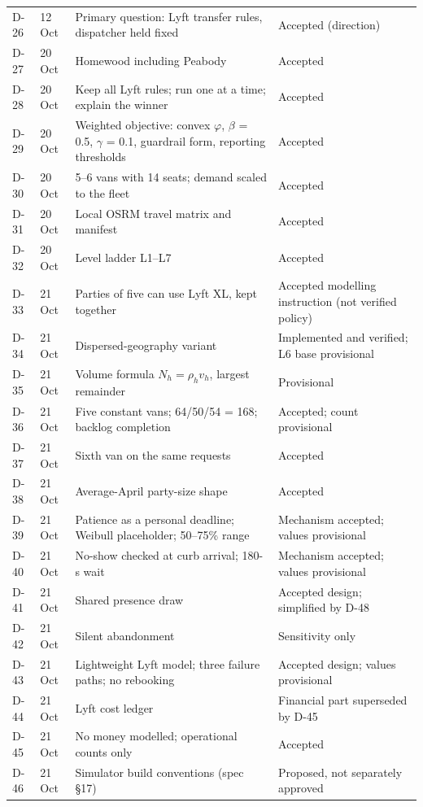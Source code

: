 \documentclass[11pt,letterpaper]{article}
\begin{document}
{\begin{longtable}{@{}P{1.25cm}P{1.45cm}P{8.0cm}P{3.0cm}@{}}
D-26 & 12 Oct & Primary question: Lyft transfer rules, dispatcher held fixed & Accepted (direction)\\
D-27 & 20 Oct & Homewood including Peabody & Accepted\\
D-28 & 20 Oct & Keep all Lyft rules; run one at a time; explain the winner & Accepted\\
D-29 & 20 Oct & Weighted objective: convex $\varphi$, $\beta$ = 0.5, $\gamma$ = 0.1, guardrail form, reporting thresholds & Accepted\\
D-30 & 20 Oct & 5--6 vans with 14 seats; demand scaled to the fleet & Accepted\\
D-31 & 20 Oct & Local OSRM travel matrix and manifest & Accepted\\
D-32 & 20 Oct & Level ladder L1--L7 & Accepted\\
D-33 & 21 Oct & Parties of five can use Lyft XL, kept together & Accepted modelling instruction (not verified policy)\\
D-34 & 21 Oct & Dispersed-geography variant & Implemented and verified; L6 base provisional\\
D-35 & 21 Oct & Volume formula $N_h = \rho_h v_h$, largest remainder & Provisional\\
D-36 & 21 Oct & Five constant vans; 64/50/54 = 168; backlog completion & Accepted; count provisional\\
D-37 & 21 Oct & Sixth van on the same requests & Accepted\\
D-38 & 21 Oct & Average-April party-size shape & Accepted\\
D-39 & 21 Oct & Patience as a personal deadline; Weibull placeholder; 50--75\% range & Mechanism accepted; values provisional\\
D-40 & 21 Oct & No-show checked at curb arrival; 180-s wait & Mechanism accepted; values provisional\\
D-41 & 21 Oct & Shared presence draw & Accepted design; simplified by D-48\\
D-42 & 21 Oct & Silent abandonment & Sensitivity only\\
D-43 & 21 Oct & Lightweight Lyft model; three failure paths; no rebooking & Accepted design; values provisional\\
D-44 & 21 Oct & Lyft cost ledger & Financial part superseded by D-45\\
D-45 & 21 Oct & No money modelled; operational counts only & Accepted\\
D-46 & 21 Oct & Simulator build conventions (spec §17) & Proposed, not separately approved\\

\end{longtable}}
\end{document}
